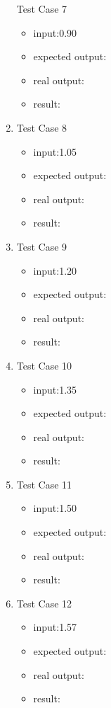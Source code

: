\documentclass[10pt,a4paper,twoside]{article}
\begin{document}
\begin{enumerate}
Test Case 7
\begin{itemize}
    \item input:0.90
    \item expected output:
    \item real output:
    \item result:
\end{itemize}
\item 
Test Case 8
\begin{itemize}
    \item input:1.05
    \item expected output:
    \item real output:
    \item result:
\end{itemize}
\item 
Test Case 9
\begin{itemize}
    \item input:1.20
    \item expected output:
    \item real output:
    \item result:
\end{itemize}
\item 
Test Case 10
\begin{itemize}
    \item input:1.35
    \item expected output:
    \item real output:
    \item result:
\end{itemize}
\item 
Test Case 11
\begin{itemize}
    \item input:1.50
    \item expected output:
    \item real output:
    \item result:
\end{itemize}
\item 
Test Case 12
\begin{itemize}
    \item input:1.57
    \item expected output:
    \item real output:
    \item result:
\end{itemize}

\end{enumerate}





\end{document}
